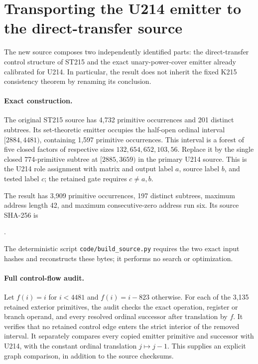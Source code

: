 \section{Transporting the U214 emitter to the direct-transfer source}
\label{sec:st-source}

The new source composes two independently identified parts: the direct-transfer
control structure of ST215 and the exact unary-power-cover emitter already
calibrated for U214.  In particular, the result does not inherit the fixed
K215 consistency theorem by renaming its conclusion.

\paragraph{Exact construction.}
The original ST215 source has 4,732 primitive occurrences and 201 distinct
subtrees.  Its set-theoretic emitter occupies the half-open ordinal interval
$[2884,4481)$, containing 1,597 primitive occurrences.  This interval is a
forest of five closed factors of respective sizes $132,654,652,103,56$.
Replace it by the single closed 774-primitive subtree at $[2885,3659)$ in
the primary U214 source.  This is the U214 role assignment with matrix and
output label $a$, source label $b$, and tested label $c$; the retained gate
requires $c\ne a,b$.

The result has 3,909 primitive occurrences, 197 distinct subtrees, maximum
address length 42, and maximum consecutive-zero address run six.  Its source
SHA-256 is
\begin{center}\small
\texttt{}.
\end{center}
The deterministic script \texttt{code/build\_source.py} requires the two exact input
hashes and reconstructs these bytes; it performs no search or optimization.

\paragraph{Full control-flow audit.}
Let $f(i)=i$ for $i<4481$ and $f(i)=i-823$ otherwise.  For each of the 3,135
retained exterior primitives, the audit checks the exact operation, register
or branch operand, and every resolved ordinal successor after translation
by $f$.  It verifies that no retained control edge enters the strict interior
of the removed interval.  It separately compares every copied emitter
primitive and successor with U214, with the constant ordinal translation
$j\mapsto j-1$.  This supplies an explicit graph comparison, in addition
to the source checksums.

